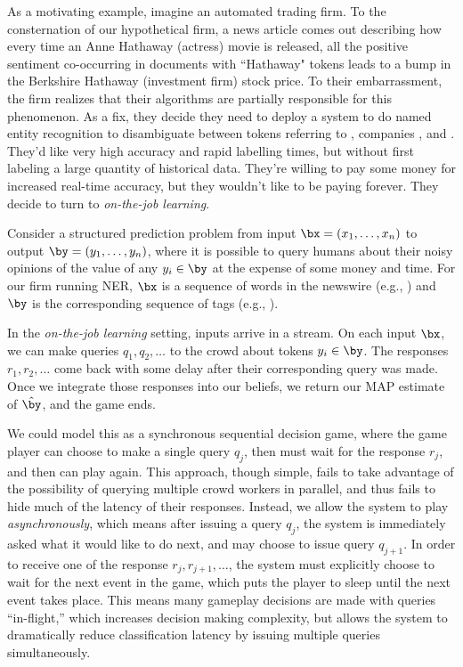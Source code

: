 As a motivating example, imagine an automated trading firm.
To the consternation of our hypothetical firm, a news article comes out describing how every time an Anne Hathaway (actress) movie is released, all the positive sentiment co-occurring in documents with ``Hathaway" tokens leads to a bump in the Berkshire Hathaway (investment firm) stock price.
To their embarrassment, the firm realizes that their algorithms are partially responsible for this phenomenon.
As a fix, they decide they need to deploy a system to do named entity recognition to disambiguate between tokens referring to \scper{}, companies \todo{}, and \scnone{}.
They'd like very high accuracy and rapid labelling times, but without first labeling a large quantity of historical data. They're willing to pay some money for increased real-time accuracy, but they wouldn't like to be paying forever.
They decide to turn to \emph{on-the-job learning}.

Consider a structured prediction problem from input $\bx = (x_1, \dots, x_n)$ to output $\by = (y_1, \dots, y_n)$,
where it is possible to query humans about their noisy opinions of the value of any $y_i \in \by$
at the expense of some money and time.
For our firm running NER, $\bx$ is a sequence of words in the newswire (e.g., )
and $\by$ is the corresponding sequence of tags (e.g., \scper{} \scnone{} \scnone{} \scnone{}).

In the \emph{on-the-job learning} setting, inputs arrive in a stream.
On each input $\bx$, we can make queries $q_1, q_2, \dots$ to the crowd about tokens $y_i \in \by$.
The responses $r_1, r_2, \dots$ come back with some delay after their corresponding query was made.
Once we integrate those responses into our beliefs, we return our MAP estimate of $\hat \by$, and the game ends.

We could model this as a synchronous sequential decision game, where the game player can choose to make a single query $q_j$, then must wait for the response $r_j$, and then can play again.
This approach, though simple, fails to take advantage of the possibility of querying multiple crowd workers in parallel, and thus fails to hide much of the latency of their responses.
Instead, we allow the system to play \emph{asynchronously}, which means after issuing a query $q_j$, the system is immediately asked what it would like to do next, and may choose to issue query $q_{j+1}$.
In order to receive one of the response $r_j, r_{j+1}, \dots$, the system must explicitly choose to wait for the next event in the game, which puts the player to sleep until the next event takes place.
This means many gameplay decisions are made with queries ``in-flight,'' which increases decision making complexity, but allows the system to dramatically reduce classification latency by issuing multiple queries simultaneously.

